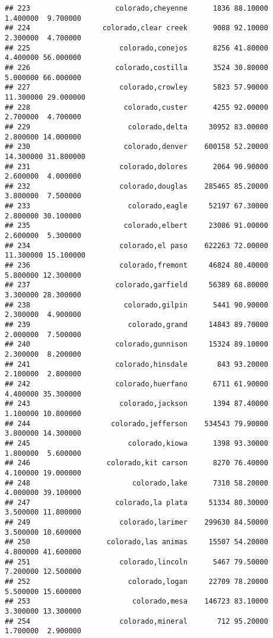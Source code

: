 \documentclass[
]{article}
\begin{document}
\begin{verbatim}
## 223                    colorado,cheyenne      1836 88.10000  1.400000  9.700000
## 224                 colorado,clear creek      9088 92.10000  2.300000  4.700000
## 225                     colorado,conejos      8256 41.80000  4.400000 56.000000
## 226                    colorado,costilla      3524 30.80000  5.000000 66.000000
## 227                     colorado,crowley      5823 57.90000 11.300000 29.000000
## 228                      colorado,custer      4255 92.00000  2.700000  4.700000
## 229                       colorado,delta     30952 83.00000  2.800000 14.000000
## 230                      colorado,denver    600158 52.20000 14.300000 31.800000
## 231                     colorado,dolores      2064 90.90000  2.600000  4.000000
## 232                     colorado,douglas    285465 85.20000  3.800000  7.500000
## 233                       colorado,eagle     52197 67.30000  2.800000 30.100000
## 235                      colorado,elbert     23086 91.00000  2.600000  5.300000
## 234                     colorado,el paso    622263 72.00000 11.300000 15.100000
## 236                     colorado,fremont     46824 80.40000  5.800000 12.300000
## 237                    colorado,garfield     56389 68.80000  3.300000 28.300000
## 238                      colorado,gilpin      5441 90.90000  2.300000  4.900000
## 239                       colorado,grand     14843 89.70000  2.000000  7.500000
## 240                    colorado,gunnison     15324 89.10000  2.300000  8.200000
## 241                    colorado,hinsdale       843 93.20000  2.100000  2.800000
## 242                    colorado,huerfano      6711 61.90000  4.400000 35.300000
## 243                     colorado,jackson      1394 87.40000  1.100000 10.800000
## 244                   colorado,jefferson    534543 79.90000  3.800000 14.300000
## 245                       colorado,kiowa      1398 93.30000  1.800000  5.600000
## 246                  colorado,kit carson      8270 76.40000  4.100000 19.000000
## 248                        colorado,lake      7310 58.20000  4.000000 39.100000
## 247                    colorado,la plata     51334 80.30000  3.500000 11.800000
## 249                     colorado,larimer    299630 84.50000  3.500000 10.600000
## 250                  colorado,las animas     15507 54.20000  4.800000 41.600000
## 251                     colorado,lincoln      5467 79.50000  7.200000 12.500000
## 252                       colorado,logan     22709 78.20000  5.500000 15.600000
## 253                        colorado,mesa    146723 83.10000  3.300000 13.300000
## 254                     colorado,mineral       712 95.20000  1.700000  2.900000

\end{verbatim}
\end{document}
